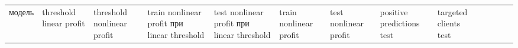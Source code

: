 \documentclass[11pt]{article}
\newcounter{none}
\begin{document}
{\def\LTcaptype{none} %
\begin{longtable}[]{@{}
  >{\raggedright\arraybackslash}p{}
  >{\raggedleft\arraybackslash}p{}
  >{\raggedleft\arraybackslash}p{}
  >{\raggedleft\arraybackslash}p{}
  >{\raggedleft\arraybackslash}p{}
  >{\raggedleft\arraybackslash}p{}
  >{\raggedleft\arraybackslash}p{}
  >{\raggedleft\arraybackslash}p{}
  >{\raggedleft\arraybackslash}p{}
  >{\raggedleft\arraybackslash}p{}
  >{\raggedleft\arraybackslash}p{}
  >{\raggedleft\arraybackslash}p{}
  >{\raggedleft\arraybackslash}p{}@{}}
\toprule\noalign{}
\begin{minipage}[b]{\linewidth}\raggedright
модель
\end{minipage} & \begin{minipage}[b]{\linewidth}\raggedleft
threshold linear profit
\end{minipage} & \begin{minipage}[b]{\linewidth}\raggedleft
threshold nonlinear profit
\end{minipage} & \begin{minipage}[b]{\linewidth}\raggedleft
train nonlinear profit при linear threshold
\end{minipage} & \begin{minipage}[b]{\linewidth}\raggedleft
test nonlinear profit при linear threshold
\end{minipage} & \begin{minipage}[b]{\linewidth}\raggedleft
train nonlinear profit
\end{minipage} & \begin{minipage}[b]{\linewidth}\raggedleft
test nonlinear profit
\end{minipage} & \begin{minipage}[b]{\linewidth}\raggedleft
positive predictions test
\end{minipage} & \begin{minipage}[b]{\linewidth}\raggedleft
targeted clients test
\end{minipage} & \begin{minipage}[b]{\linewidth}\raggedleft

\end{minipage}
\end{longtable}}
\end{document}

